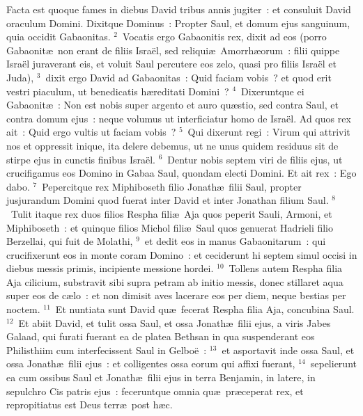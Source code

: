 \lettrine[lines=3,image=true,loversize=0.05,lraise=-0.03]{F}{}acta est quoque fames in diebus David tribus annis jugiter~: et consuluit David oraculum Domini. Dixitque Dominus~: Propter Saul, et domum ejus sanguinum, quia occidit Gabaonitas.
${}^{2}$~Vocatis ergo Gabaonitis rex, dixit ad eos (porro Gabaonit\ae\ non erant de filiis Isra\"el, sed reliqui\ae\ Amorrh\ae orum~: filii quippe Isra\"el juraverant eis, et voluit Saul percutere eos zelo, quasi pro filiis Isra\"el et Juda),
${}^{3}$~dixit ergo David ad Gabaonitas~: Quid faciam vobis~? et quod erit vestri piaculum, ut benedicatis h\ae reditati Domini~?
${}^{4}$~Dixeruntque ei Gabaonit\ae~: Non est nobis super argento et auro qu\ae stio, sed contra Saul, et contra domum ejus~: neque volumus ut interficiatur homo de Isra\"el. Ad quos rex ait~: Quid ergo vultis ut faciam vobis~?
${}^{5}$~Qui dixerunt regi~: Virum qui attrivit nos et oppressit inique, ita delere debemus, ut ne unus quidem residuus sit de stirpe ejus in cunctis finibus Isra\"el.
${}^{6}$~Dentur nobis septem viri de filiis ejus, ut crucifigamus eos Domino in Gabaa Saul, quondam electi Domini. Et ait rex~: Ego dabo.
${}^{7}$~Pepercitque rex Miphiboseth filio Jonath\ae\ filii Saul, propter jusjurandum Domini quod fuerat inter David et inter Jonathan filium Saul.
${}^{8}$~Tulit itaque rex duos filios Respha fili\ae\ Aja quos peperit Sauli, Armoni, et Miphiboseth~: et quinque filios Michol fili\ae\ Saul quos genuerat Hadrieli filio Berzellai, qui fuit de Molathi,
${}^{9}$~et dedit eos in manus Gabaonitarum~: qui crucifixerunt eos in monte coram Domino~: et ceciderunt hi septem simul occisi in diebus messis primis, incipiente messione hordei.
${}^{10}$~Tollens autem Respha filia Aja cilicium, substravit sibi supra petram ab initio messis, donec stillaret aqua super eos de c\ae lo~: et non dimisit aves lacerare eos per diem, neque bestias per noctem.
${}^{11}$~Et nuntiata sunt David qu\ae\ fecerat Respha filia Aja, concubina Saul.
${}^{12}$~Et abiit David, et tulit ossa Saul, et ossa Jonath\ae\ filii ejus, a viris Jabes Galaad, qui furati fuerant ea de platea Bethsan in qua suspenderant eos Philisthiim cum interfecissent Saul in Gelbo\"e~:
${}^{13}$~et asportavit inde ossa Saul, et ossa Jonath\ae\ filii ejus~: et colligentes ossa eorum qui affixi fuerant,
${}^{14}$~sepelierunt ea cum ossibus Saul et Jonath\ae\ filii ejus in terra Benjamin, in latere, in sepulchro Cis patris ejus~: feceruntque omnia qu\ae\ pr\ae ceperat rex, et repropitiatus est Deus terr\ae\ post h\ae c.


